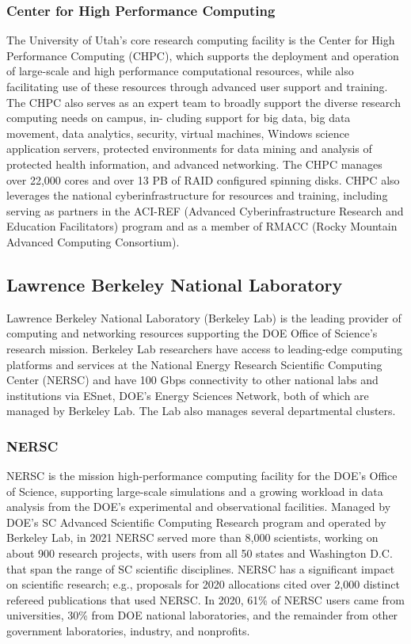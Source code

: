 \subsubsection*{Center for High Performance Computing}
The University of Utah’s core research computing facility is the Center for High Performance Computing (CHPC), which supports the deployment and operation of large-scale and high performance computational resources, while also facilitating use of these resources through advanced user support and training. The CHPC also serves as an expert team to broadly support the diverse research computing needs on campus, in- cluding support for big data, big data movement, data analytics, security, virtual machines, Windows science application servers, protected environments for data mining and analysis of protected health information, and advanced networking. The CHPC manages over 22,000 cores and over 13 PB of RAID configured spinning disks. CHPC also leverages the national cyberinfrastructure for resources and training, including serving as partners in the ACI-REF (Advanced Cyberinfrastructure Research and Education Facilitators) program and as a member of RMACC (Rocky Mountain Advanced Computing Consortium).


\subsection*{Lawrence Berkeley National Laboratory}

Lawrence Berkeley National Laboratory (Berkeley Lab) is the leading provider of computing and networking resources supporting the DOE Office of Science's research mission. Berkeley Lab researchers have access to leading-edge computing platforms and services at the National Energy Research Scientific Computing Center (NERSC) and have 100 Gbps connectivity to other national labs and institutions via ESnet, DOE's Energy Sciences Network, both of which are managed by Berkeley Lab. The Lab also manages several departmental clusters.

\subsubsection*{NERSC}

NERSC is the mission high-performance computing facility for the DOE's Office of Science, supporting large-scale simulations and a growing workload in data analysis from the DOE's experimental and observational facilities. Managed by DOE's SC Advanced Scientific Computing Research program and operated by Berkeley Lab, in 2021 NERSC served more than 8,000 scientists, working on about 900 research projects, with users from all 50 states and Washington D.C. that span the range of SC scientific disciplines. NERSC has a significant impact on scientific research; e.g., proposals for 2020 allocations cited over 2,000 distinct refereed publications that used NERSC. In 2020, 61\% of NERSC users came from universities, 30\% from DOE national laboratories, and the remainder from other government laboratories, industry, and nonprofits. 


